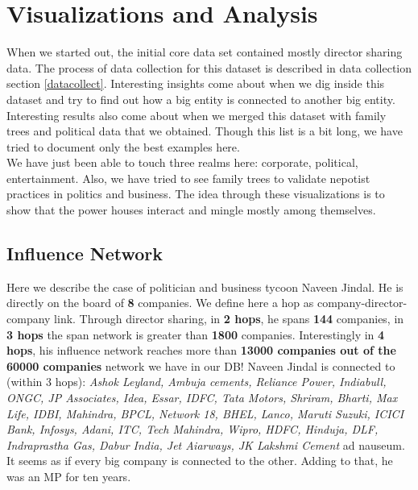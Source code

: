 \chapter{Visualizations and Analysis}
\label{chapviz}

When we started out, the initial core data set contained mostly director sharing data. The process of data collection for this dataset is described in data collection section \ref{datacollect}. Interesting insights come about when we dig inside this dataset and try to find out how a big entity is connected to another big entity. \\

Interesting results also come about when we merged this dataset with family trees and political data that we obtained. Though this list is a bit long, we have tried to document only the best examples here. \\

We have just been able to touch three realms here: corporate, political, entertainment.
Also, we have tried to see family trees to validate nepotist practices in politics and business. The idea through these visualizations is to show that the power houses interact and mingle mostly among themselves. \\


\section{Influence Network}

Here we describe the case of politician and business tycoon Naveen Jindal. He is directly on the board of \textbf{8} companies. We define here a hop as company-director-company link. Through director sharing, in \textbf{2 hops}, he spans \textbf{144} companies, in \textbf{3 hops} the span network is greater than \textbf{1800} companies. Interestingly in \textbf{4 hops}, his influence network reaches more than \textbf{13000 companies out of the 60000 companies} network we have in our DB!  Naveen Jindal is connected to (within 3 hops): \emph{Ashok Leyland, Ambuja cements, Reliance Power, Indiabull, ONGC, JP Associates, Idea, Essar, IDFC, Tata Motors, Shriram, Bharti, Max Life, IDBI, Mahindra, BPCL, Network 18, BHEL, Lanco, Maruti Suzuki, ICICI Bank, Infosys, Adani, ITC, Tech Mahindra, Wipro, HDFC, Hinduja, DLF, Indraprastha Gas, Dabur India, Jet Aiarways, JK Lakshmi Cement} ad nauseum. It seems as if every big company is connected to the other. Adding to that, he was an MP for ten years.


